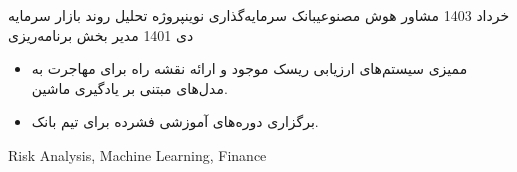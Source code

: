 \begin{experiences}
  \consultantexperience
    {خرداد 1403} {مشاور هوش مصنوعی}{بانک سرمایه‌گذاری نوین}{پروژه تحلیل روند بازار سرمایه}
    {دی 1401} {مدیر بخش برنامه‌ریزی}{} {
      \begin{itemize}
        \item ممیزی سیستم‌های ارزیابی ریسک موجود و ارائه نقشه راه  برای مهاجرت به مدل‌های مبتنی بر یادگیری ماشین.
        \item برگزاری دوره‌های آموزشی فشرده برای تیم  بانک.
      \end{itemize}
    }
    {Risk Analysis, Machine Learning, Finance}
\end{experiences}
